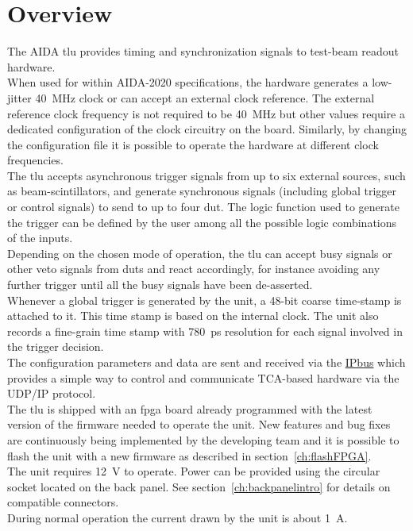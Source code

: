 \section{Overview}
The AIDA \gls{tlu} provides timing and synchronization signals to test-beam readout hardware.\\
When used for within AIDA-2020 specifications, the hardware generates a low-jitter 40~MHz clock or can accept an external clock reference. The external reference clock frequency is not required to be 40~MHz but other values require a dedicated configuration of the clock circuitry on the board. Similarly, by changing the configuration file it is possible to operate the hardware at different clock frequencies.\\
The \gls{tlu} accepts asynchronous trigger signals from up to six external sources, such as beam-scintillators, and generate synchronous signals (including global trigger or control signals) to send to up to four \gls{dut}. The logic function used to generate the trigger can be defined by the user among all the possible logic combinations of the inputs.\\
Depending on the chosen mode of operation, the \gls{tlu} can accept busy signals or other veto signals from \gls{dut}s and react accordingly, for instance avoiding any further trigger until all the busy signals have been de-asserted.\\
Whenever a global trigger is generated by the unit, a 48-bit coarse time-stamp is attached to it. This time stamp is based on the internal clock. The unit also records a fine-grain time stamp with 780~ps resolution for each signal involved in the trigger decision.\\
The configuration parameters and data are sent and received via the \href{https://www.ohwr.org/projects/ipbus}{IPbus} which provides a simple way to control and communicate TCA-based hardware via the UDP/IP protocol.\\
The \gls{tlu} is shipped with an \gls{fpga} board already programmed with the latest version of the firmware needed to operate the unit. New features and bug fixes are continuously being implemented by the developing team and it is possible to flash the unit with a new firmware as described in section~\ref{ch:flashFPGA}.\\
The unit requires 12~V to operate. Power can be provided using the circular socket located on the back panel. See section~\ref{ch:backpanelintro} for details on compatible connectors.\\
During normal operation the current drawn by the unit is about 1~A.

